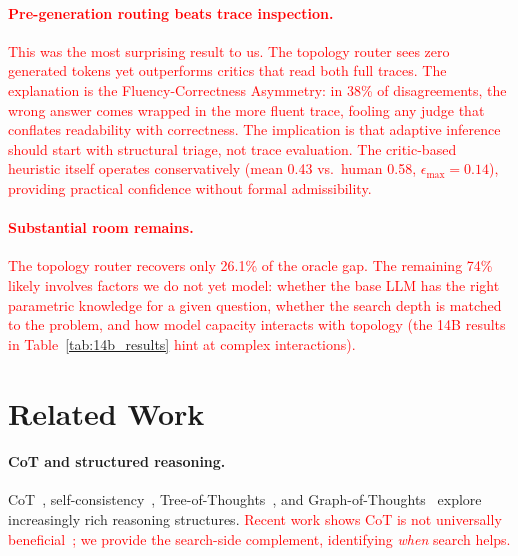 \documentclass[11pt]{article}
\begin{document}
\textcolor{red}{\paragraph{Pre-generation routing beats trace inspection.}
This was the most surprising result to us. The topology router sees zero generated tokens yet outperforms critics that read both full traces. The explanation is the Fluency-Correctness Asymmetry: in 38\% of disagreements, the wrong answer comes wrapped in the more fluent trace, fooling any judge that conflates readability with correctness. The implication is that adaptive inference should start with structural triage, not trace evaluation. The critic-based heuristic itself operates conservatively (mean 0.43 vs.\ human 0.58, $\epsilon_{\max}=0.14$), providing practical confidence without formal admissibility.}

\textcolor{red}{\paragraph{Substantial room remains.}
The topology router recovers only 26.1\% of the oracle gap. The remaining 74\% likely involves factors we do not yet model: whether the base LLM has the right parametric knowledge for a given question, whether the search depth is matched to the problem, and how model capacity interacts with topology (the 14B results in Table~\ref{tab:14b_results} hint at complex interactions).}






\section{Related Work}
\label{sec:related}

\paragraph{CoT and structured reasoning.}
CoT~\cite{wei2022chain}, self-consistency~\cite{wang2022self}, Tree-of-Thoughts~\cite{yao2024tree}, and Graph-of-Thoughts~\cite{besta2024graph} explore increasingly rich reasoning structures. \textcolor{red}{Recent work shows CoT is not universally beneficial~\cite{meincke2025cot}; we provide the search-side complement, identifying \emph{when} search helps.}
\end{document}
